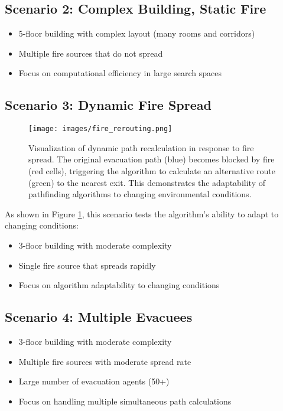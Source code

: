 \documentclass[11pt,a4paper]{report}
\begin{document}
\subsection{Scenario 2: Complex Building, Static Fire}
\begin{itemize}
    \item 5-floor building with complex layout (many rooms and corridors)
    \item Multiple fire sources that do not spread
    \item Focus on computational efficiency in large search spaces
\end{itemize}

\subsection{Scenario 3: Dynamic Fire Spread}
\begin{figure}[H]
    \centering
    \texttt{[image: images/fire\_rerouting.png]}
    \caption{Visualization of dynamic path recalculation in response to fire spread. The original evacuation path (blue) becomes blocked by fire (red cells), triggering the algorithm to calculate an alternative route (green) to the nearest exit. This demonstrates the adaptability of pathfinding algorithms to changing environmental conditions.}
    \label{fig:fire_rerouting}
\end{figure}

As shown in Figure \ref{fig:fire_rerouting}, this scenario tests the algorithm's ability to adapt to changing conditions:
\begin{itemize}
    \item 3-floor building with moderate complexity
    \item Single fire source that spreads rapidly
    \item Focus on algorithm adaptability to changing conditions
\end{itemize}

\subsection{Scenario 4: Multiple Evacuees}
\begin{itemize}
    \item 3-floor building with moderate complexity
    \item Multiple fire sources with moderate spread rate
    \item Large number of evacuation agents (50+)
    \item Focus on handling multiple simultaneous path calculations
\end{itemize}
\end{document}
